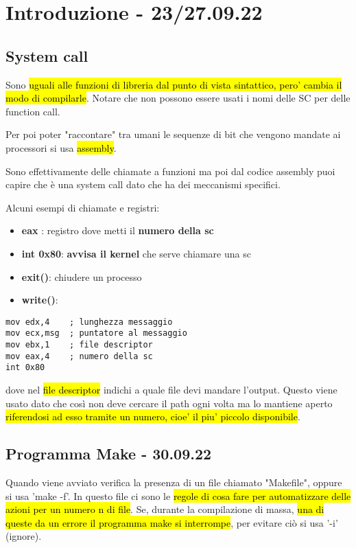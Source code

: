 \newpage
\section{Introduzione - 23/27.09.22}

\subsection{System call}

Sono \hl{uguali alle funzioni di libreria dal punto di vista sintattico, pero' cambia il modo di compilarle}. Notare che non possono essere usati i nomi delle SC per delle function call.

Per poi poter "raccontare" tra umani le sequenze di bit che vengono mandate ai processori si usa \hl{assembly}.

Sono effettivamente delle chiamate a funzioni ma poi dal codice assembly puoi capire che è una system call dato che ha dei meccanismi specifici.

Alcuni esempi di chiamate e registri:
\begin{itemize}
	\item \textbf{eax} : registro dove metti il \textbf{numero della sc}
	\item \textbf{int 0x80}: \textbf{avvisa il kernel} che serve chiamare una sc
	\item \textbf{exit()}: chiudere un processo
	\item \textbf{write()}:
\end{itemize}

\begin{lstlisting}
mov edx,4    ; lunghezza messaggio
mov ecx,msg  ; puntatore al messaggio
mov ebx,1    ; file descriptor
mov eax,4    ; numero della sc
int 0x80	
\end{lstlisting}

dove nel \hl{file descriptor} indichi a quale file devi mandare l'output. Questo viene usato dato che così non deve cercare il path ogni volta ma lo mantiene aperto \hl{riferendosi ad esso tramite un numero, cioe' il piu' piccolo disponibile}.


\subsection{Programma Make - 30.09.22}

Quando viene avviato verifica la presenza di un file chiamato "Makefile", oppure si usa 'make -f'. In questo file ci sono le \hl{regole di cosa fare per automatizzare delle azioni per un numero n di file}. Se, durante la compilazione di massa, \hl{una di queste da un errore il programma make si interrompe}, per evitare ciò si usa '-i' (ignore).

